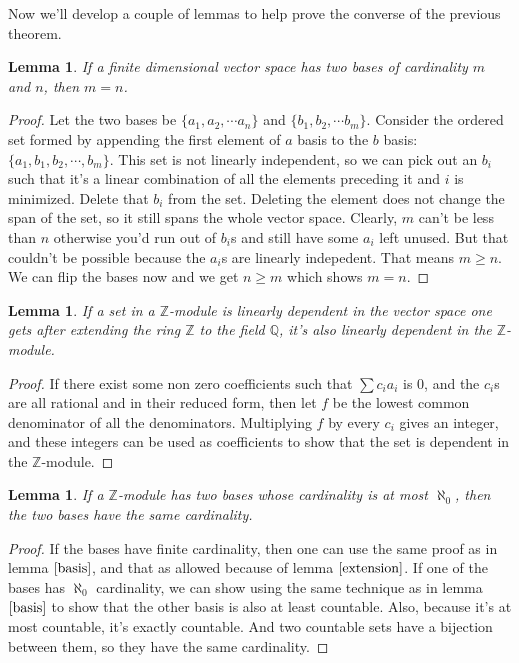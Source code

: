 \documentclass[12pt]{article}
\newtheorem{lem}[thm]{Lemma}
\theoremstyle{definition}
\begin{document}
Now we'll develop a couple of lemmas to help prove the converse of the previous theorem.

\begin{lem}\label{basis}\cite{halmos}
If a finite dimensional vector space has two bases of cardinality $m$ and $n$, then $m=n$.
\end{lem}

\begin{proof}
Let the two bases be $\{a_1, a_2 ,\cdots a_n\}$ and $\{b_1, b_2, \cdots b_m\}$. Consider the ordered set formed by appending the first element of $a$ basis to the $b$ basis: $\{a_1, b_1, b_2, \cdots, b_m\}$. This set is not linearly independent, so we can pick out an $b_i$ such that it's a linear combination of all the elements preceding it and $i$ is minimized. Delete that $b_i$ from the set. Deleting the element does not change the span of the set, so it still spans the whole vector space. Clearly, $m$ can't be less than $n$ otherwise you'd run out of $b_i$s and still have some $a_i$ left unused. But that couldn't be possible because the $a_i$s are linearly indepedent. That means $m \geq n$. We can flip the bases now and we get $n \geq m$ which shows $m=n$.
\end{proof}

\begin{lem}\label{extension}
If a set in a $\mathbb{Z}$-module is linearly dependent in the vector space one gets after extending the ring $\mathbb{Z}$ to the field $\mathbb{Q}$, it's also linearly dependent in the $\mathbb{Z}$-module.
\end{lem}

\begin{proof}
If there exist some non zero coefficients such that $\sum c_ia_i$ is $0$, and the $c_i$s are all rational and in their reduced form, then let $f$ be the lowest common denominator of all the denominators. Multiplying $f$ by every $c_i$ gives an integer, and these integers can be used as coefficients to show that the set is dependent in the $\mathbb{Z}$-module.
\end{proof}

\begin{lem}
If a $\mathbb{Z}$-module has two bases whose cardinality is at most $\aleph_0$, then the two bases have the same cardinality.
\end{lem}

\begin{proof}
If the bases have finite cardinality, then one can use the same proof as in lemma $\autoref{basis}$, and that as allowed because of lemma $\autoref{extension}$. If one of the bases has $\aleph_0$ cardinality, we can show using the same technique as in lemma $\autoref{basis}$ to show that the other basis is also at least countable. Also, because it's at most countable, it's exactly countable. And two countable sets have a bijection between them, so they have the same cardinality.
\end{proof}
\end{document}
